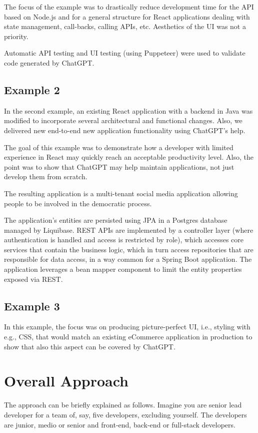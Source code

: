\documentclass[runningheads]{llncs}
\begin{document}
The focus of the example was to drastically reduce development time for the API based on Node.js and for a general structure for React applications dealing with state management, call-backs, calling APIs, etc. Aesthetics of the UI was not a priority. 

Automatic API testing and UI testing (using Puppeteer) were used to validate code generated by ChatGPT.

\subsection{Example 2}
In the second example, an existing React application with a backend in Java was modified to incorporate several architectural and functional changes. Also, we delivered new end-to-end new application functionality using ChatGPT's help. 

The goal of this example was to demonstrate how a developer with limited experience in React may quickly reach an acceptable productivity level. Also, the point was to show that ChatGPT may help maintain applications, not just develop them from scratch. 

The resulting application is a multi-tenant social media application allowing people to be involved in the democratic process. 

The application's entities are persisted using JPA in a Postgres database managed by Liquibase. REST APIs are implemented by a controller layer (where authentication is handled and access is restricted by role), which accesses core services that contain the business logic, which in turn access repositories that are responsible for data access, in a way common for a Spring Boot application. The application leverages a bean mapper component to limit the entity properties exposed via REST.

\subsection{Example 3}
In this example, the focus was on producing picture-perfect UI, i.e., styling with e.g., CSS, that would match an existing eCommerce application in production to show that also this aspect can be covered by ChatGPT.

\section{Overall Approach}
The approach can be briefly explained as follows. Imagine you are senior lead developer for a team of, say, five developers, excluding yourself. The developers are junior, medio or senior and front-end, back-end or full-stack developers.
\end{document}
